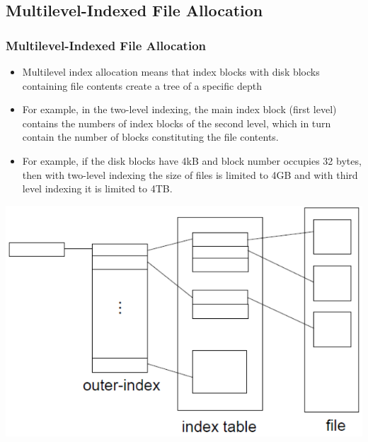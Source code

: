 \documentclass{beamer}
\begin{document}
\subsection{Multilevel-Indexed File Allocation}
\begin{frame}
\frametitle{Multilevel-Indexed File Allocation}
\begin{itemize}
\item Multilevel index allocation means that index blocks with disk blocks containing file contents create a tree of a specific depth
\item For example, in the two-level indexing, the main index block (first level) contains the numbers of index blocks of the second level, which in turn contain the number of blocks constituting the file contents.
\item For example, if the disk blocks have 4kB and block number occupies 32 bytes, then with two-level indexing the size of files is limited to 4GB and with third level indexing it is limited to 4TB.
\end{itemize}
\includegraphics[scale=0.25]{multi.png}
\end{frame}
\end{document}
